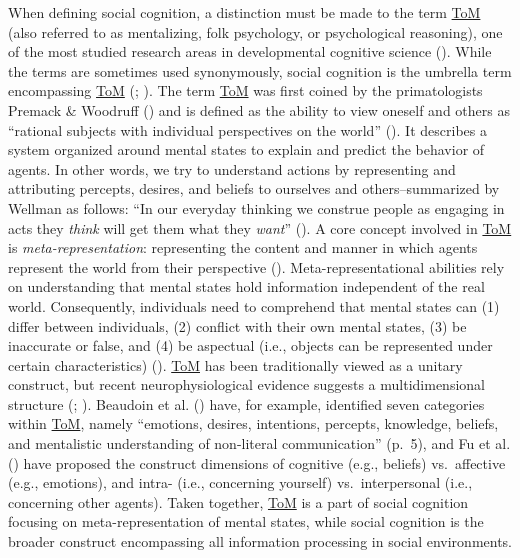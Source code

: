 \documentclass[
]{scrbook}
\begin{document}
When defining social cognition, a distinction must be made to the term \hyperref[acronyms_ToM]{ToM} (also referred to as mentalizing, folk psychology, or psychological reasoning), one of the most studied research areas in developmental cognitive science (). While the terms are sometimes used synonymously, social cognition is the umbrella term encompassing \hyperref[acronyms_ToM]{ToM} (; ). The term \hyperref[acronyms_ToM]{ToM} was first coined by the primatologists Premack \& Woodruff () and is defined as the ability to view oneself and others as ``rational subjects with individual perspectives on the world'' (). It describes a system organized around mental states to explain and predict the behavior of agents. In other words, we try to understand actions by representing and attributing percepts, desires, and beliefs to ourselves and others\thinspace --\thinspace summarized by Wellman as follows: ``In our everyday thinking we construe people as engaging in acts they \emph{think} will get them what they \emph{want}'' (). A core concept involved in \hyperref[acronyms_ToM]{ToM} is \emph{meta-representation}: representing the content and manner in which agents represent the world from their perspective (). Meta-representational abilities rely on understanding that mental states hold information independent of the real world. Consequently, individuals need to comprehend that mental states can (1) differ between individuals, (2) conflict with their own mental states, (3) be inaccurate or false, and (4) be aspectual (i.e., objects can be represented under certain characteristics) (). \hyperref[acronyms_ToM]{ToM} has been traditionally viewed as a unitary construct, but recent neurophysiological evidence suggests a multidimensional structure (; ). Beaudoin et al. () have, for example, identified seven categories within \hyperref[acronyms_ToM]{ToM}, namely ``emotions, desires, intentions, percepts, knowledge, beliefs, and mentalistic understanding of non-literal communication'' (p.~5), and Fu et al. () have proposed the construct dimensions of cognitive (e.g., beliefs) vs.~affective (e.g., emotions), and intra- (i.e., concerning yourself) vs.~interpersonal (i.e., concerning other agents). Taken together, \hyperref[acronyms_ToM]{ToM} is a part of social cognition focusing on meta-representation of mental states, while social cognition is the broader construct encompassing all information processing in social environments.
\end{document}
